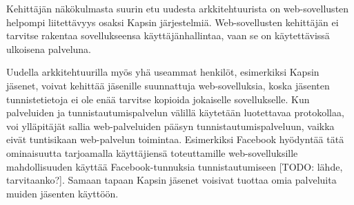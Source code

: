 Kehittäjän näkökulmasta suurin etu uudesta arkkitehtuurista on web-sovellusten helpompi liitettävyys osaksi Kapsin järjestelmiä. Web-sovellusten kehittäjän ei tarvitse rakentaa sovellukseensa käyttäjänhallintaa, vaan se on käytettävissä ulkoisena palveluna.

Uudella arkkitehtuurilla myös yhä useammat henkilöt, esimerkiksi Kapsin jäsenet, voivat kehittää jäsenille suunnattuja web-sovelluksia, koska jäsenten tunnistetietoja ei ole enää tarvitse kopioida jokaiselle sovellukselle. Kun palveluiden ja tunnistautumispalvelun välillä käytetään luotettavaa protokollaa, voi ylläpitäjät sallia web-palveluiden pääsyn tunnistautumispalveluun, vaikka eivät tuntisikaan web-palvelun toimintaa. Esimerkiksi Facebook hyödyntää tätä ominaisuutta tarjoamalla käyttäjiensä toteuttamille web-sovelluksille mahdollisuuden käyttää Facebook-tunnuksia tunnistautumiseen [TODO: lähde, tarvitaanko?]. Samaan tapaan Kapsin jäsenet voisivat tuottaa omia palveluita muiden jäsenten käyttöön.